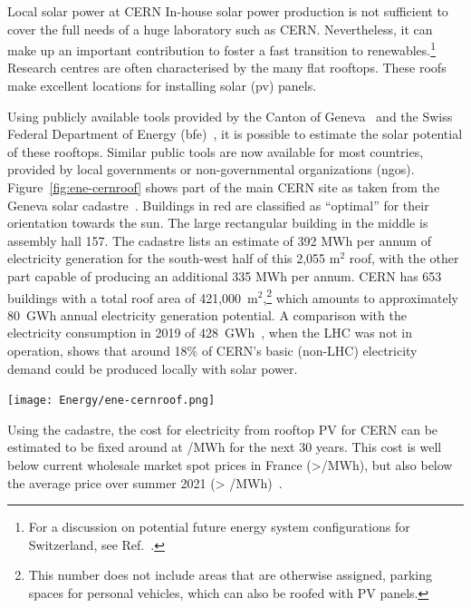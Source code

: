 \documentclass[../SustainableHEP.tex]{subfiles}
\begin{document}
\begin{casestudy}{Local solar power at CERN}%
    In-house solar power production is not sufficient to cover the full needs of a huge laboratory such as CERN. Nevertheless, it can make up an important contribution to foster a fast transition to renewables.\footnote{For a discussion on potential future energy system configurations for Switzerland, see Ref.~\cite{Zuettel}.} Research centres are often characterised by the many flat rooftops. These roofs make excellent locations for installing solar (\acrshort{pv}) panels. 

    Using publicly available tools provided by the Canton of Geneva~\cite{SIG} and the Swiss Federal Department of Energy (\acrshort{bfe})~\cite{BFE}, it is possible to estimate the solar potential of these rooftops. Similar public tools are now available for most countries, provided by local governments or non-governmental organizations (\acrshort{ngo}s). Figure~\ref{fig:ene-cernroof} shows part of the main CERN site as taken from the Geneva solar cadastre~\cite{SIG}. Buildings in red are classified as “optimal” for their orientation towards the sun. The large rectangular building in the middle is assembly hall 157. The cadastre lists an estimate of 392 MWh per annum of electricity generation for the south-west half of this 2,055 m$^2$ roof, with the other part capable of producing an additional 335 MWh per annum. CERN has 653 buildings with a total roof area of 421,000~m$^2$,\footnote{This number does not include areas that are otherwise assigned, \eg parking spaces for personal vehicles, which can also be roofed with PV panels.} which amounts to approximately 80~GWh annual electricity generation potential. A comparison with the electricity consumption in 2019 of 428~GWh~\cite{Environment:2737239}, when the LHC was not in operation, shows that around 18\% of CERN’s basic (non-LHC) electricity demand could be produced locally with solar power.

    \begin{center}
    \captionsetup{type=figure}
    \texttt{[image: Energy/ene-cernroof.png]}
    \caption[CERN roofs suitable for solar cells]%
        {Map of CERN buildings. Roofs that are suitable for PV installation in respect to their received solar irradiation are shown in red (very suitable) and yellow (suitable). In addition other areas like \eg parking lots could also be covered by PV-panelled roofs. From Ref.~\cite{SIG}.\label{fig:ene-cernroof}}
    \end{center}

    Using the cadastre, the cost for electricity from rooftop PV for CERN can be estimated to be fixed around at /MWh for the next 30 years. This cost is well below current wholesale market spot prices in France (>/MWh), but also below the average price over summer 2021 (> /MWh)~\cite{FranceMix}.
\end{casestudy}
\end{document}
